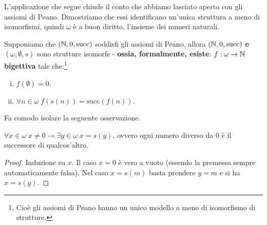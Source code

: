 L'applicazione che segue chiude il conto che abbiamo lasciato aperto con gli assiomi di Peano. Dimostriamo che essi identificano un'unica struttura a meno di isomorfismi, quindi $\omega$ è 
a buon diritto, l'insieme dei numeri naturali.

\begin{theorem}
	Supponiamo che $(\mathbb N, 0, \text{succ})$ soddisfi gli assiomi di Peano, allora $(\mathbb N, 0, \text{succ})$ \textbf{e} $(\omega,\emptyset,s)$ sono strutture isomorfe - \textbf{ossia, formalmente, esiste}:
	$ f : \omega \rightarrow \mathbb N$ \textbf{bigettiva} tale che:\footnote{Cioè gli assiomi di Peano hanno un unico modello a meno di isomorfismo di strutture.}
	\begin{enumerate}[(i)]
		\item $f(\emptyset) = 0$.
		\item $\forall n \in \omega \; f(s(n)) = \text{succ}(f(n))$.
	\end{enumerate}
\end{theorem}

Fa comodo isolare la seguente osservazione.

\begin{remark}
	$\forall x \in \omega \; x \ne 0 \rightarrow \exists y \in \omega \; x = s(y)$, ovvero ogni numero diverso da 0 è il successore di qualcos'altro.
\end{remark}

\begin{proof}
	Induzione su $x$. Il caso $x = 0$ è vero a vuoto (essendo la premessa sempre automaticamente falsa). Nel caso $x = s(m)$ basta prendere $y = m$ e si ha $x = s(y)$.
\end{proof}

